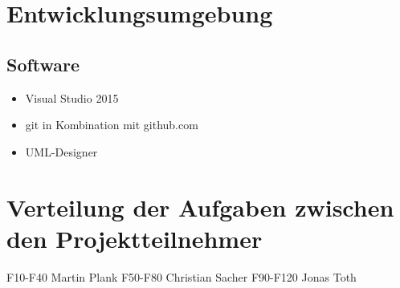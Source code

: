\documentclass[a4paper,10pt]{report}
\begin{document}
\section{Entwicklungsumgebung}
\subsection{Software}
\begin{itemize}
\item Visual Studio 2015
\item git in Kombination mit github.com
\item UML-Designer
\end{itemize}
\section{Verteilung der Aufgaben zwischen den Projektteilnehmer}
F10-F40 Martin Plank
F50-F80 Christian Sacher
F90-F120 Jonas Toth
\end{document}
